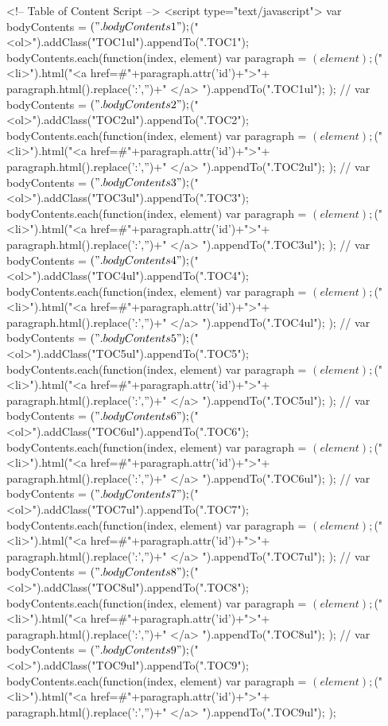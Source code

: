 <!-- Table of Content Script -->
<script type="text/javascript">
var bodyContents = $(".bodyContents1");
$("<ol>").addClass("TOC1ul").appendTo(".TOC1");
bodyContents.each(function(index, element) {
    var paragraph = $(element);
    $("<li>").html("<a href=#"+paragraph.attr('id')+">"+ paragraph.html().replace(':','')+" </a> ").appendTo(".TOC1ul");
     });
// 
var bodyContents = $(".bodyContents2");
$("<ol>").addClass("TOC2ul").appendTo(".TOC2");
bodyContents.each(function(index, element) {
    var paragraph = $(element);
    $("<li>").html("<a href=#"+paragraph.attr('id')+">"+ paragraph.html().replace(':','')+" </a> ").appendTo(".TOC2ul");
     });
// 
var bodyContents = $(".bodyContents3");
$("<ol>").addClass("TOC3ul").appendTo(".TOC3");
bodyContents.each(function(index, element) {
    var paragraph = $(element);
    $("<li>").html("<a href=#"+paragraph.attr('id')+">"+ paragraph.html().replace(':','')+" </a> ").appendTo(".TOC3ul");
     });
//
var bodyContents = $(".bodyContents4");
$("<ol>").addClass("TOC4ul").appendTo(".TOC4");
bodyContents.each(function(index, element) {
    var paragraph = $(element);
    $("<li>").html("<a href=#"+paragraph.attr('id')+">"+ paragraph.html().replace(':','')+" </a> ").appendTo(".TOC4ul");
     });
//
var bodyContents = $(".bodyContents5");
$("<ol>").addClass("TOC5ul").appendTo(".TOC5");
bodyContents.each(function(index, element) {
    var paragraph = $(element);
    $("<li>").html("<a href=#"+paragraph.attr('id')+">"+ paragraph.html().replace(':','')+" </a> ").appendTo(".TOC5ul");
     });
//
var bodyContents = $(".bodyContents6");
$("<ol>").addClass("TOC6ul").appendTo(".TOC6");
bodyContents.each(function(index, element) {
    var paragraph = $(element);
    $("<li>").html("<a href=#"+paragraph.attr('id')+">"+ paragraph.html().replace(':','')+" </a> ").appendTo(".TOC6ul");
     });
//
var bodyContents = $(".bodyContents7");
$("<ol>").addClass("TOC7ul").appendTo(".TOC7");
bodyContents.each(function(index, element) {
    var paragraph = $(element);
    $("<li>").html("<a href=#"+paragraph.attr('id')+">"+ paragraph.html().replace(':','')+" </a> ").appendTo(".TOC7ul");
     });
//
var bodyContents = $(".bodyContents8");
$("<ol>").addClass("TOC8ul").appendTo(".TOC8");
bodyContents.each(function(index, element) {
    var paragraph = $(element);
    $("<li>").html("<a href=#"+paragraph.attr('id')+">"+ paragraph.html().replace(':','')+" </a> ").appendTo(".TOC8ul");
     });
//
var bodyContents = $(".bodyContents9");
$("<ol>").addClass("TOC9ul").appendTo(".TOC9");
bodyContents.each(function(index, element) {
    var paragraph = $(element);
    $("<li>").html("<a href=#"+paragraph.attr('id')+">"+ paragraph.html().replace(':','')+" </a> ").appendTo(".TOC9ul");
     });

